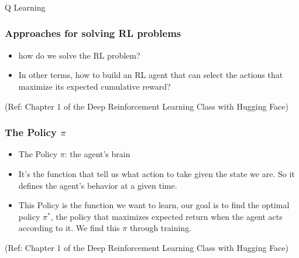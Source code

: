 \begin{frame}[fragile]\frametitle{}
\begin{center}
{\Large Q Learning}
\end{center}
\end{frame}


\begin{frame}[fragile]\frametitle{Approaches for solving RL problems}

\begin{itemize}
\item how do we solve the RL problem?
\item In other terms, how to build an RL agent that can select the actions that maximize its expected cumulative reward?
\end{itemize}

{\tiny (Ref: Chapter 1 of the Deep Reinforcement Learning Class with Hugging Face)}


\end{frame}

\begin{frame}[fragile]\frametitle{The Policy $\pi$}


\begin{itemize}
\item The Policy $\pi$: the agent’s brain
\item It’s the function that tell us what action to take given the state we are. So it defines the agent’s behavior at a given time.
\item This Policy is the function we want to learn, our goal is to find the optimal policy $\pi^*$, the policy that  maximizes expected return when the agent acts according to it. We find this $\pi$ through training.
\end{itemize}

{\tiny (Ref: Chapter 1 of the Deep Reinforcement Learning Class with Hugging Face)}


\end{frame}


